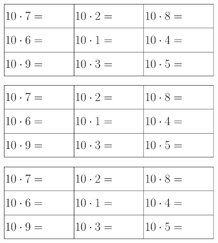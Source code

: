 \vs
\begin{figure}
	\includegraphics[]{g10a}
\end{figure}		
\vs
\begin{figure}
	\includegraphics[]{g10a}
\end{figure}
\vs
\begin{figure}
	\includegraphics[]{g10a}
\end{figure}
\newpage



